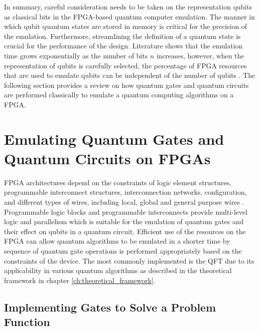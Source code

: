 In summary, careful consideration needs to be taken on the representation qubits as classical bits in the FPGA-based quantum computer emulation. The manner in which qubit quantum states are stored in memory is critical for the precision of the emulation. Furthermore, streamlining the definition of a quantum state is crucial for the performance of the design. Literature shows that the emulation time grows exponentially as the number of bits $n$ increases, however, when the representation of qubits is carefully selected, the percentage of FPGA resources that are used to emulate qubits can be independent of the number of qubits \cite{Hlukhov2021, hong2022quantum}. The following section provides a review on how quantum gates and quantum circuits are performed classically to emulate a quantum computing algorithms on a FPGA. 

\section{Emulating Quantum Gates and Quantum Circuits on FPGAs \label{sec:lit-fpga-qgate-qcircuit}}

FPGA architectures depend on the constraints of logic element structures, programmable interconnect structures, interconnection networks, configuration, and different types of wires, including local, global and general purpose wires \cite{wolf2004fpga}. Programmable logic blocks and programmable interconnects provide multi-level logic and parallelism which is suitable for the emulation of quantum gates and their effect on qubits in a quantum circuit. Efficient use of the resources on the FPGA can allow quantum algorithms to be emulated in a shorter time by sequence of quantum gate operations is performed appropriately based on the constraints of the device. The most commonly implemented is the QFT due to its applicability in various quantum algorithms as described in the theoretical framework in chapter \ref{ch:theoretical_framework}. 

\subsection{Implementing Gates to Solve a Problem Function}

